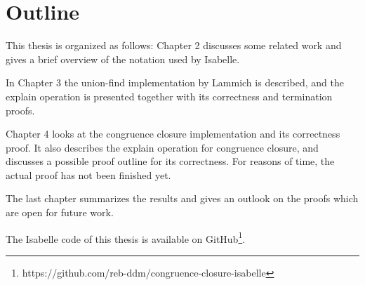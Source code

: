 \section{Outline}
This thesis is organized as follows: Chapter 2 discusses some related work and gives a brief overview of the notation used by Isabelle.

In Chapter 3 the union-find implementation by Lammich \cite{unionfind-isabelle} is described, and the explain operation is presented together with its correctness and termination proofs.

Chapter 4 looks at the congruence closure implementation and its correctness proof. It also describes the explain operation for congruence closure, and discusses a possible proof outline for its correctness. For reasons of time, the actual proof has not been finished yet.

The last chapter summarizes the results and gives an outlook on the proofs which are open for future work.

The Isabelle code of this thesis is available on GitHub\footnote{https://github.com/reb-ddm/congruence-closure-isabelle}.



